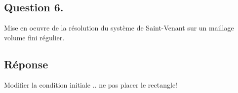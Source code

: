 \documentclass[
	french,
	11pt, %
]{fphw}
\begin{document}
\subsection*{Question 6.}

\begin{problem}
	Mise en oeuvre de la résolution du système de Saint-Venant sur un maillage volume fini régulier. 
\end{problem}

\subsection*{Réponse} 
Modifier la condition initiale .. ne pas placer le rectangle!
\end{document}
